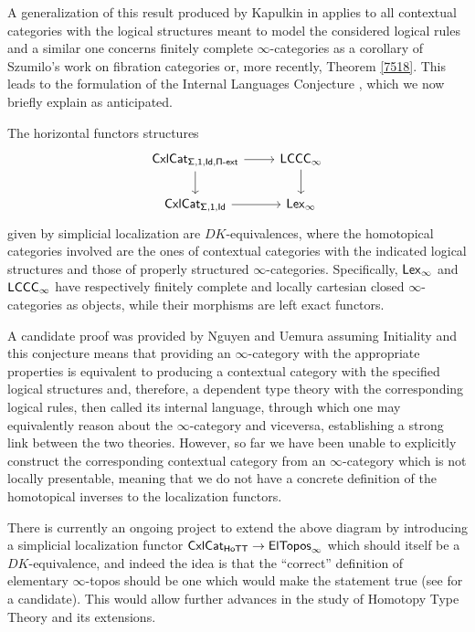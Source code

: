 \noindent
A generalization of this result produced by Kapulkin in \cite{Kap17}
applies to all contextual categories with the
logical structures meant to model the considered logical rules and a similar one
concerns finitely complete $\infty$-categories as a corollary of Szumilo's
work on fibration categories \cite{Szu14}
or, more recently, Theorem \ref{7518}. This leads to
the formulation of the Internal Languages Conjecture \cite{KL16}, which we now
briefly explain as anticipated.

\begin{named}\label{intlang}
  The horizontal functors structures
  \[\begin{tikzcd}
    {\Cxl_{\Sigmas,\mathsf{1},\Ids,\Piext}} & \LCCCi \\
    {\Cxl_{\Sigmas,\mathsf{1},\Ids}} & \Lexi
    \arrow[from=2-1, to=2-2]
    \arrow[from=1-2, to=2-2]
    \arrow[from=1-1, to=2-1]
    \arrow[from=1-1, to=1-2]
  \end{tikzcd}\]
  given by simplicial localization are $DK$-equivalences, where the homotopical
  categories involved are the ones of contextual categories with the indicated
  logical structures and those of properly structured $\infty$-categories.
  Specifically, $\operatorname{\mathsf{Lex}_\infty}$ and $\operatorname{\mathsf{LCCC}_\infty}$ have respectively finitely complete and
  locally cartesian closed $\infty$-categories as objects, while their morphisms
  are left exact functors.
\end{named}

\noindent
A candidate proof was provided by Nguyen and Uemura \cite{NU22} assuming
Initiality and this
conjecture means that providing an $\infty$-category with the appropriate
properties is equivalent to producing a contextual category with the specified
logical structures and, therefore, a dependent type theory with the
corresponding logical rules, then called its internal language, through which
one may equivalently reason about the $\infty$-category and viceversa,
establishing a strong link between the two theories.
However, so far we have
been unable to explicitly construct the corresponding contextual category from
an $\infty$-category which is not locally presentable, meaning that we do not
have a concrete definition of the homotopical inverses to the localization
functors.

\noindent
There is currently an ongoing project to 
extend the above diagram by introducing a simplicial localization
functor $\operatorname{\mathsf{CxlCat}}_{\mathsf{HoTT}}\rightarrow\operatorname{\mathsf{ElTopos}_\infty}$ which should itself be a
$DK$-equivalence, and indeed the idea is that the ``correct'' definition of
elementary $\infty$-topos should be one which would make the statement true (see
\cite{Ras18} for a candidate). This would allow further advances in the study of
Homotopy Type Theory and its extensions.
